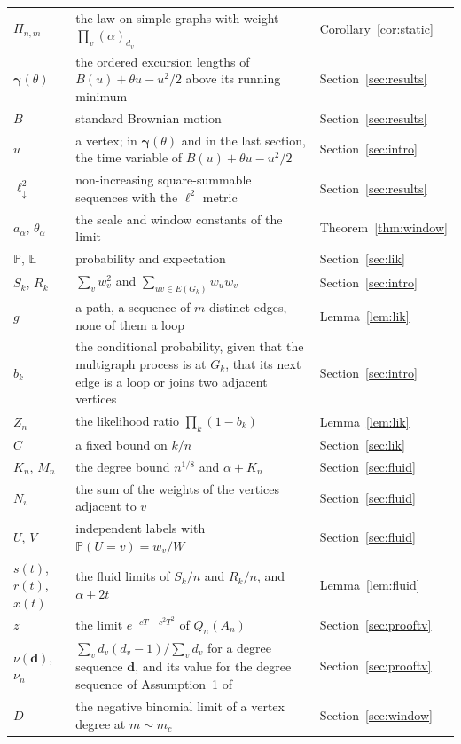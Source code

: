 \documentclass[11pt]{amsart}
\theoremstyle{remark}
\numberwithin{equation}{section}
\newcommand{\PP}{\mathbb{P}}
\newcommand{\EE}{\mathbb{E}}
\newcommand{\ldown}{\ell^2_{\downarrow}}
\begin{document}
{\begin{longtable}{@{}lp{}l@{}}
$\Pi_{n,m}$ & the law on simple graphs with weight $\prod_v(\alpha)_{d_v}$ & Corollary~\ref{cor:static} \\
$\boldsymbol\gamma(\theta)$ & the ordered excursion lengths of $B(u)+\theta u-u^2/2$ above its running minimum & Section~\ref{sec:results} \\
$B$ & standard Brownian motion & Section~\ref{sec:results} \\
$u$ & a vertex; in $\boldsymbol\gamma(\theta)$ and in the last section, the time variable of $B(u)+\theta u-u^2/2$ & Section~\ref{sec:intro} \\
$\ldown$ & non-increasing square-summable sequences with the $\ell^2$ metric & Section~\ref{sec:results} \\
$a_\alpha$, $\theta_\alpha$ & the scale and window constants of the limit & Theorem~\ref{thm:window} \\
$\PP$, $\EE$ & probability and expectation & Section~\ref{sec:lik} \\
$S_k$, $R_k$ & $\sum_v w_v^2$ and $\sum_{uv\in E(G_k)} w_uw_v$ & Section~\ref{sec:intro} \\
$g$ & a path, a sequence of $m$ distinct edges, none of them a loop & Lemma~\ref{lem:lik} \\
$b_k$ & the conditional probability, given that the multigraph process is at $G_k$, that its next edge is a loop or joins two adjacent vertices & Section~\ref{sec:intro} \\
$Z_n$ & the likelihood ratio $\prod_k(1-b_k)$ & Lemma~\ref{lem:lik} \\
$C$ & a fixed bound on $k/n$ & Section~\ref{sec:lik} \\
$K_n$, $M_n$ & the degree bound $n^{1/8}$ and $\alpha+K_n$ & Section~\ref{sec:fluid} \\
$N_v$ & the sum of the weights of the vertices adjacent to $v$ & Section~\ref{sec:fluid} \\
$U$, $V$ & independent labels with $\PP(U=v)=w_v/W$ & Section~\ref{sec:fluid} \\
$s(t)$, $r(t)$, $x(t)$ & the fluid limits of $S_k/n$ and $R_k/n$, and $\alpha+2t$ & Lemma~\ref{lem:fluid} \\
$z$ & the limit $e^{-cT-c^2T^2}$ of $Q_n(A_n)$ & Section~\ref{sec:prooftv} \\
$\nu(\boldsymbol d)$, $\nu_n$ & $\sum_v d_v(d_v-1)/\sum_v d_v$ for a degree sequence $\boldsymbol d$, and its value for the degree sequence of Assumption~1 of \cite{DHLS17} & Section~\ref{sec:prooftv} \\
$D$ & the negative binomial limit of a vertex degree at $m\sim m_c$ & Section~\ref{sec:window} \\

\end{longtable}}
\end{document}

